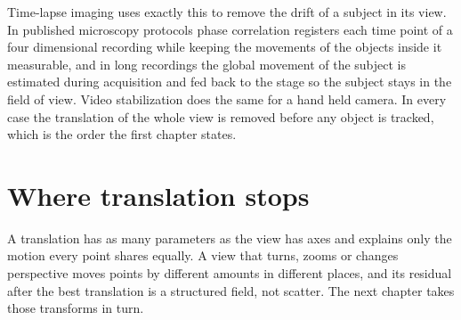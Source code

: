 Time-lapse imaging uses exactly this to remove the drift of a subject in its view. In published
microscopy protocols phase correlation registers each time point of a four dimensional recording
while keeping the movements of the objects inside it measurable, and in long recordings the global
movement of the subject is estimated during acquisition and fed back to the stage so the subject
stays in the field of view. Video stabilization does the same for a hand held camera. In every case
the translation of the whole view is removed before any object is tracked, which is the order the
first chapter states.

\section{Where translation stops}

A translation has as many parameters as the view has axes and explains only the motion every point
shares equally. A view that turns, zooms or changes perspective moves points by different amounts
in different places, and its residual after the best translation is a structured field, not
scatter. The next chapter takes those transforms in turn.
